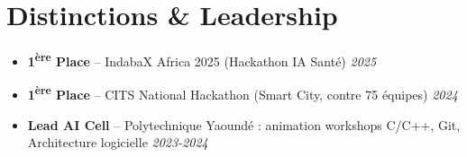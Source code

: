 \documentclass[a4paper,11pt]{article}
\begin{document}
\section{Distinctions \& Leadership}
\begin{itemize}[leftmargin=*, label=\tiny$\bullet$, nosep]
    \item \textbf{1\textsuperscript{ère} Place} -- IndabaX Africa 2025 (Hackathon IA Santé) \hfill \textit{2025}
    \item \textbf{1\textsuperscript{ère} Place} -- CITS National Hackathon (Smart City, contre 75 équipes) \hfill \textit{2024}
    \item \textbf{Lead AI Cell} -- Polytechnique Yaoundé : animation workshops C/C++, Git, Architecture logicielle \hfill \textit{2023-2024}
\end{itemize}
\end{document}
